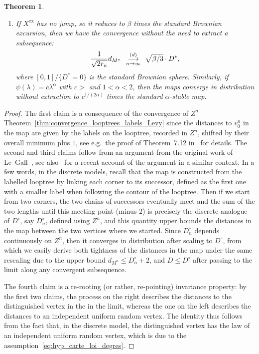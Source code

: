 \documentclass[british, a4paper,11pt]{article}
\numberwithin{equation}{section}
\newtheorem{thm}{\bfseries \upshape Theorem}[section]
\theoremstyle{definition}
\newcommand{\cvloi}[1][n]{\enskip\mathop{\longrightarrow}^{(d)}_{#1 \to \infty}\enskip}
\newcommand{\exc}{\mathrm{ex}}
\begin{document}
\begin{thm}
\begin{enumerate}
\item If $X^{\exc}$ has no jump, so it reduces to $\beta$ times the standard Brownian excursion, then we have the convergence without the need to extract a subsequence:
\[\frac{1}{\sqrt{2 r_n}} d_{M^n} \cvloi \sqrt{\beta/3} \cdot D^\ast,\]
where $[0,1]/\{D^\ast=0\}$ is the standard Brownian sphere.
Similarly, if $\psi(\lambda)=c \lambda^\alpha$ with $c>$ and $1 < \alpha < 2$, 
then the maps converge in distribution without extraction to 
$c^{1/(2\alpha)}$ times the standard $\alpha$-stable map.
\end{enumerate}
\end{thm}


\begin{proof}
The first claim is a consequence of the convergence of $Z^n$ Theorem~\ref{thm:convergence_looptrees_labels_Levy} since the distances to $v^n_0$ in the map are given by the labels on the looptree, recorded in $Z^n$, shifted by their overall minimum plus $1$, see e.g.~the proof of Theorem~7.12 in~\cite{Mar19} for details.
The second and third claims follow from an argument from the original work of Le~Gall~\cite{LG07}, see also~\cite[Lemma~2.6]{Mar24} for a recent account of the argument in a similar context.
In a few words, in the discrete models, recall that the map is constructed from the labelled looptree by linking each corner to its successor, defined as the first one with a smaller label when following the contour of the looptree. Then if we start from two corners, the two chains of successors eventually meet and the sum of the two lengths until this meeting point (minus $2$) is precisely the discrete analogue of $D^\circ$, say $D^\circ_n$, defined using $Z^n$, and this quantity upper bounds the distances in the map between the two vertices where we started.
Since $D^\circ_n$ depends continuously on $Z^n$, then it converges in distribution after scaling to $D^\circ$, from which we easily derive both tightness of the distances in the map under the same rescaling due to the upper bound $d_{M^n} \le D^\circ_n+2$, and $D \le D^\circ$ after passing to the limit along any convergent subsequence.

The fourth claim is a re-rooting (or rather, re-pointing) invariance property: by the first two claims, the process on the right describes the distances to the distinguished vertex in the in the limit, whereas the one on the left describes the distances to an independent uniform random vertex. The identity thus follows from the fact that, in the discrete model, the distinguished vertex has the law of an independent uniform random vertex, which is due to the assumption~\eqref{eq:hyp_carte_loi_degres}.


\end{proof}
\end{document}

